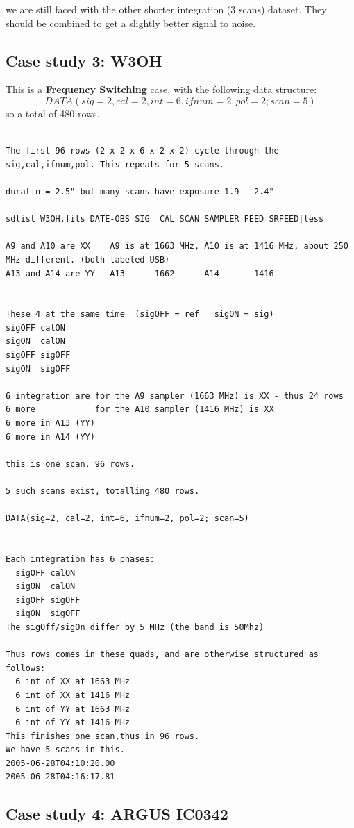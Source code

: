\documentclass[12pt,a4paper]{article}
\begin{document}
we are still faced with the other shorter integration (3 scans) dataset. They should be combined to get a
slightly better signal to noise.

\subsection{Case study 3: W3OH }

This is a {\bf Frequency Switching} case, with the following data structure:
$$
    DATA(sig=2,cal=2,int=6,ifnum=2,pol=2; scan=5)
$$
    so a total of 480 rows. 

\begin{verbatim}

The first 96 rows (2 x 2 x 6 x 2 x 2) cycle through the sig,cal,ifnum,pol. This repeats for 5 scans.

duratin = 2.5" but many scans have exposure 1.9 - 2.4"

sdlist W3OH.fits DATE-OBS SIG  CAL SCAN SAMPLER FEED SRFEED|less

A9 and A10 are XX    A9 is at 1663 MHz, A10 is at 1416 MHz, about 250 MHz different. (both labeled USB)
A13 and A14 are YY   A13      1662      A14       1416


These 4 at the same time  (sigOFF = ref   sigON = sig)
sigOFF calON
sigON  calON
sigOFF sigOFF
sigON  sigOFF

6 integration are for the A9 sampler (1663 MHz) is XX - thus 24 rows
6 more            for the A10 sampler (1416 MHz) is XX
6 more in A13 (YY)
6 more in A14 (YY)

this is one scan, 96 rows.

5 such scans exist, totalling 480 rows.

DATA(sig=2, cal=2, int=6, ifnum=2, pol=2; scan=5)


Each integration has 6 phases:
  sigOFF calON
  sigON  calON
  sigOFF sigOFF
  sigON  sigOFF
The sigOff/sigOn differ by 5 MHz (the band is 50Mhz)

Thus rows comes in these quads, and are otherwise structured as follows:
  6 int of XX at 1663 MHz
  6 int of XX at 1416 MHz
  6 int of YY at 1663 MHz
  6 int of YY at 1416 MHz
This finishes one scan,thus in 96 rows.
We have 5 scans in this.
2005-06-28T04:10:20.00
2005-06-28T04:16:17.81

\end{verbatim}

\subsection{Case study 4: ARGUS IC0342}
\end{document}
